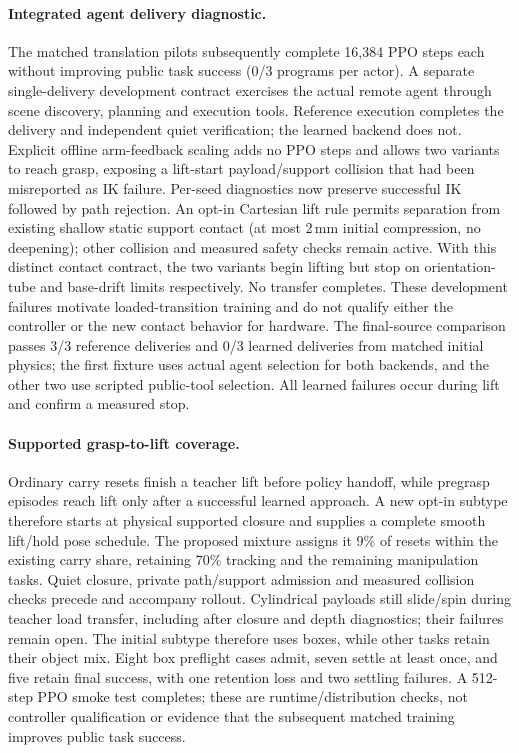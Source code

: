 \paragraph{Integrated agent delivery diagnostic.}
The matched translation pilots subsequently complete 16,384 PPO steps each
without improving public task success (0/3 programs per actor). A separate
single-delivery development contract exercises the actual remote agent through
scene discovery, planning and execution tools. Reference execution completes
the delivery and independent quiet verification; the learned backend does not.
Explicit offline arm-feedback scaling adds no PPO steps and allows two variants
to reach grasp, exposing a lift-start payload/support collision that had been
misreported as IK failure. Per-seed diagnostics now preserve successful IK
followed by path rejection. An opt-in Cartesian lift rule permits separation
from existing shallow static support contact (at most 2\,mm initial compression,
no deepening); other collision and measured safety checks remain active.
With this distinct contact contract, the two variants begin lifting but stop on
orientation-tube and base-drift limits respectively. No transfer completes.
These development failures motivate loaded-transition training and do not
qualify either the controller or the new contact behavior for hardware.
The final-source comparison passes 3/3 reference deliveries and 0/3 learned
deliveries from matched initial physics; the first fixture uses actual agent
selection for both backends, and the other two use scripted public-tool
selection. All learned failures occur during lift and confirm a measured stop.

\paragraph{Supported grasp-to-lift coverage.}
Ordinary carry resets finish a teacher lift before policy handoff, while
pregrasp episodes reach lift only after a successful learned approach. A new
opt-in subtype therefore starts at physical supported closure and supplies a
complete smooth lift/hold pose schedule. The proposed mixture assigns it 9\%
of resets within the existing carry share, retaining 70\% tracking and the
remaining manipulation tasks. Quiet closure, private path/support admission and
measured collision checks precede and accompany rollout. Cylindrical payloads
still slide/spin during teacher load transfer, including after closure and depth
diagnostics; their failures remain open. The initial subtype therefore uses
boxes, while other tasks retain their object mix. Eight box preflight cases
admit, seven settle at least once, and five retain final success, with one
retention loss and two settling failures. A 512-step PPO smoke test completes;
these are runtime/distribution checks, not controller qualification or evidence
that the subsequent matched training improves public task success.

